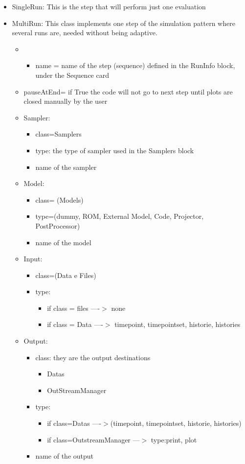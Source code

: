 \begin{itemize}
\item SingleRun: This is the step that will perform just one evaluation
\item MultiRun: This class implements one step of the simulation pattern where several runs are, needed without being adaptive.  
\begin{itemize}
\item
	\begin{itemize}
	\item name = name of the step (sequence) defined in the RunInfo block, under the Sequence card
	\end{itemize}
\item pauseAtEnd= if True the code will not go to next step until plots are closed manually by the user
\end{itemize}
\begin{itemize}
\item Sampler: 
\begin {itemize}
\item class=Samplers 
\item type: the type of sampler used in the Samplers block 
\item name of the sampler
\end{itemize}
\item Model: 
\begin{itemize}
\item class= (Models) 
\item type=(dummy, ROM, External Model, Code, Projector, PostProcessor) 
\item name of the model
\end{itemize}
\item Input:  
\begin{itemize}
\item class=(Data e Files)
\item type:
\begin{itemize}
\item if class = files ----$>$ none
\item if class = Data  ----$>$ timepoint, timepointset, historie, histories
\end{itemize}
\end{itemize}
\item Output: 
\begin{itemize}
\item class: they are the output destinations
\begin{itemize}
\item Datas 
\item OutStreamManager
\end{itemize} 
\item type:
\begin{itemize}
\item if class=Datas ----$>$(timepoint, timepointset, historie, histories) 
\item if class=OutstreamManager ---$>$ type:print, plot
\end{itemize} 
\item name of the output  
\end{itemize}


\end{itemize}
\end{itemize}

